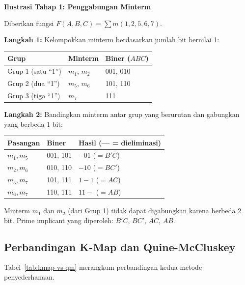 \begin{contoh}
\textbf{Ilustrasi Tahap 1: Penggabungan Minterm}

Diberikan fungsi $F(A,B,C) = \sum m(1, 2, 5, 6, 7)$.

\textbf{Langkah 1:} Kelompokkan minterm berdasarkan jumlah bit bernilai 1:
\begin{center}
\begin{tabular}{|l|l|l|}
\hline
\textbf{Grup} & \textbf{Minterm} & \textbf{Biner ($ABC$)} \\ \hline
Grup 1 (satu ``1'') & $m_1$, $m_2$ & 001, 010 \\ \hline
Grup 2 (dua ``1'') & $m_5$, $m_6$ & 101, 110 \\ \hline
Grup 3 (tiga ``1'') & $m_7$ & 111 \\ \hline
\end{tabular}
\end{center}

\textbf{Langkah 2:} Bandingkan minterm antar grup yang berurutan dan gabungkan yang berbeda 1 bit:
\begin{center}
\begin{tabular}{|l|l|l|}
\hline
\textbf{Pasangan} & \textbf{Biner} & \textbf{Hasil (--- = dieliminasi)} \\ \hline
$m_1, m_5$ & 001, 101 & $-01$ ($= B'C$) \\ \hline
$m_2, m_6$ & 010, 110 & $-10$ ($= BC'$) \\ \hline
$m_5, m_7$ & 101, 111 & $1-1$ ($= AC$) \\ \hline
$m_6, m_7$ & 110, 111 & $11-$ ($= AB$) \\ \hline
\end{tabular}
\end{center}

Minterm $m_1$ dan $m_2$ (dari Grup 1) tidak dapat digabungkan karena berbeda 2 bit. Prime implicant yang diperoleh: $B'C$, $BC'$, $AC$, $AB$.
\end{contoh}

\subsection{Perbandingan K-Map dan Quine-McCluskey}

Tabel~\ref{tab:kmap-vs-qm} merangkum perbandingan kedua metode penyederhanaan.

